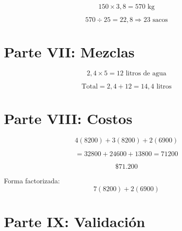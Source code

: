 \documentclass[12pt]{article}
\begin{document}
	\[
	150 \times 3{,}8 = 570 \text{ kg}
	\]
	
	\[
	570 \div 25 = 22{,}8 \Rightarrow \boxed{23 \text{ sacos}}
	\]
	
	\section*{Parte VII: Mezclas}
	
	\[
	2{,}4 \times 5 = 12 \text{ litros de agua}
	\]
	
	\[
	\text{Total} = 2{,}4 + 12 = 14{,}4 \text{ litros}
	\]
	
	\section*{Parte VIII: Costos}
	
	\[
	4(8200)+3(8200)+2(6900)
	\]
	
	\[
	=32800+24600+13800=71200
	\]
	
	\[
	\boxed{\$71.200}
	\]
	
	Forma factorizada:
	\[
	7(8200)+2(6900)
	\]
	
	\section*{Parte IX: Validación}
	
\end{document}
